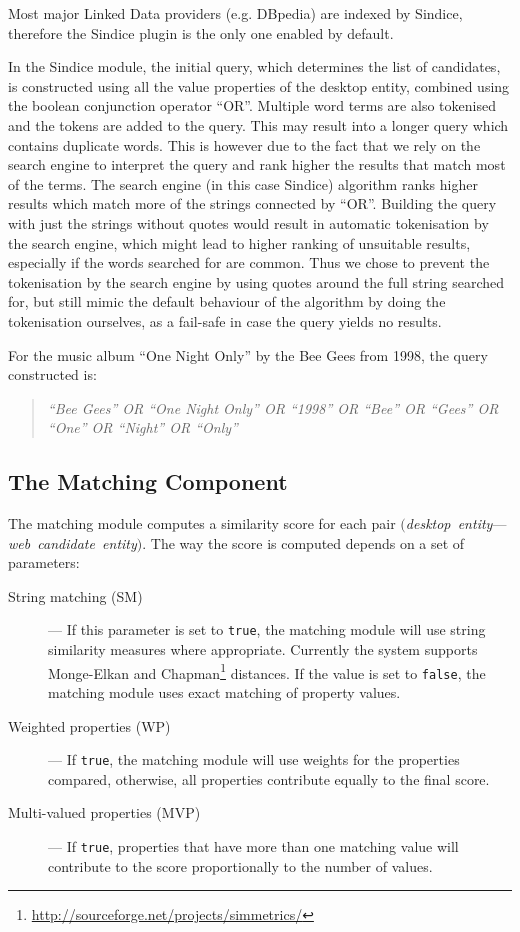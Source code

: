 Most major Linked Data providers (e.g. DBpedia) are indexed by Sindice, therefore the Sindice plugin is the only one enabled by default.

In the Sindice module, the initial query, which determines the list of candidates, is constructed using all the value properties of the desktop entity, combined using the boolean conjunction operator ``OR''. Multiple word terms are also tokenised and the tokens are added to the query. This may result into a longer query which contains duplicate words. This is however due to the fact that we rely on the search engine to interpret the query and rank higher the results that match most of the terms. The search engine (in this case Sindice) algorithm ranks higher results which match more of the strings connected by ``OR''. Building the query with just the strings without quotes would result in automatic tokenisation by the search engine, which might lead to higher ranking of unsuitable results, especially if the words searched for are common. Thus we chose to prevent the tokenisation by the search engine by using quotes around the full string searched for, but still mimic the default behaviour of the algorithm by 
doing the tokenisation ourselves, as a fail-safe in case the query yields no results. 

For the music album ``One Night Only'' by the Bee Gees from 1998,  the query constructed is:

\begin{quote}
 \emph{``Bee Gees'' OR ``One Night Only'' OR ``1998'' OR ``Bee'' OR ``Gees'' OR ``One'' OR ``Night'' OR ``Only''}
\end{quote}

\subsection{The Matching Component}
\label{sub:matchingcomp}

The matching module computes a similarity score for each pair $($\emph{desktop~entity}---\emph{web~candidate~entity}$)$. The way the score is computed depends on a set of parameters:

\begin{description}
 \item[String matching (SM)] --- If this parameter is set to \texttt{true}, the matching module will use string similarity measures where appropriate. Currently the system supports Monge-Elkan \cite{Monge1996} and Chapman\footnote{\url{http://sourceforge.net/projects/simmetrics/}} distances. If the value is set to \texttt{false}, the matching module uses exact matching of property values.
 \item[Weighted properties (WP)] --- If \texttt{true}, the matching module will use weights for the properties compared, otherwise, all properties contribute equally to the final score.
 \item[Multi-valued properties (MVP)] --- If \texttt{true}, properties that have more than one matching value will contribute to the score proportionally to the number of values. 
 \end{description}

